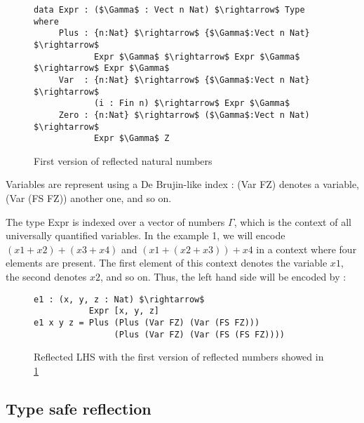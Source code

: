 \begin{figure}[H]
\figrule
\begin{center}
\begin{lstlisting}
data Expr : ($\Gamma$ : Vect n Nat) $\rightarrow$ Type where
     Plus : {n:Nat} $\rightarrow$ {$\Gamma$:Vect n Nat} $\rightarrow$ 
            Expr $\Gamma$ $\rightarrow$ Expr $\Gamma$ $\rightarrow$ Expr $\Gamma$
     Var  : {n:Nat} $\rightarrow$ {$\Gamma$:Vect n Nat} $\rightarrow$ 
            (i : Fin n) $\rightarrow$ Expr $\Gamma$
     Zero : {n:Nat} $\rightarrow$ ($\Gamma$:Vect n Nat) $\rightarrow$ 
            Expr $\Gamma$ Z
\end{lstlisting}
\end{center}
\caption{First version of reflected natural numbers}
\label{reflectedNaturalNumbers0}
\figrule
\end{figure}


Variables are represent using a De Brujin-like index : (Var FZ) denotes a variable, (Var (FS FZ)) another one, and so on.

The type Expr is indexed over a vector of numbers $\Gamma$, which is the context of all universally quantified variables. In the example 1, we will encode $(x1 + x2) + (x3 + x4)$ and $(x1 + (x2 + x3)) + x4$ in a context where four elements are present. The first element of this context denotes the variable $x1$, the second denotes $x2$, and so on.
Thus, the left hand side will be encoded by :

\begin{figure}[H]
\figrule
\begin{center}
\begin{lstlisting}
e1 : (x, y, z : Nat) $\rightarrow$ 
           Expr [x, y, z]
e1 x y z = Plus (Plus (Var FZ) (Var (FS FZ))) 
                (Plus (Var FZ) (Var (FS (FS FZ))))
\end{lstlisting}
\end{center}
\caption{Reflected LHS with the first version of reflected numbers showed in \ref{reflectedNaturalNumbers0}}
\figrule
\end{figure}

\subsection{Type safe reflection}

